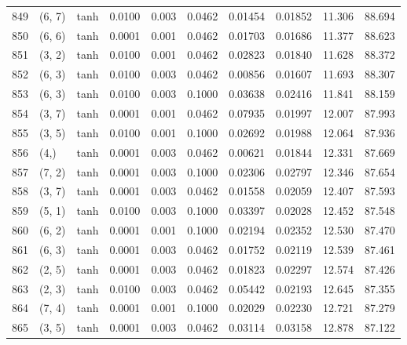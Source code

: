 \begin{tabular}{lllrrrrrrr}
849 &      (6, 7) &      tanh &  0.0100 &  0.003 &  0.0462 &          0.01454 &    0.01852 &      11.306 &    88.694 \\
850 &      (6, 6) &      tanh &  0.0001 &  0.001 &  0.0462 &          0.01703 &    0.01686 &      11.377 &    88.623 \\
851 &      (3, 2) &      tanh &  0.0100 &  0.001 &  0.0462 &          0.02823 &    0.01840 &      11.628 &    88.372 \\
852 &      (6, 3) &      tanh &  0.0100 &  0.003 &  0.0462 &          0.00856 &    0.01607 &      11.693 &    88.307 \\
853 &      (6, 3) &      tanh &  0.0100 &  0.003 &  0.1000 &          0.03638 &    0.02416 &      11.841 &    88.159 \\
854 &      (3, 7) &      tanh &  0.0001 &  0.001 &  0.0462 &          0.07935 &    0.01997 &      12.007 &    87.993 \\
855 &      (3, 5) &      tanh &  0.0100 &  0.001 &  0.1000 &          0.02692 &    0.01988 &      12.064 &    87.936 \\
856 &        (4,) &      tanh &  0.0001 &  0.003 &  0.0462 &          0.00621 &    0.01844 &      12.331 &    87.669 \\
857 &      (7, 2) &      tanh &  0.0001 &  0.003 &  0.1000 &          0.02306 &    0.02797 &      12.346 &    87.654 \\
858 &      (3, 7) &      tanh &  0.0001 &  0.003 &  0.0462 &          0.01558 &    0.02059 &      12.407 &    87.593 \\
859 &      (5, 1) &      tanh &  0.0100 &  0.003 &  0.1000 &          0.03397 &    0.02028 &      12.452 &    87.548 \\
860 &      (6, 2) &      tanh &  0.0001 &  0.001 &  0.1000 &          0.02194 &    0.02352 &      12.530 &    87.470 \\
861 &      (6, 3) &      tanh &  0.0001 &  0.003 &  0.0462 &          0.01752 &    0.02119 &      12.539 &    87.461 \\
862 &      (2, 5) &      tanh &  0.0001 &  0.003 &  0.0462 &          0.01823 &    0.02297 &      12.574 &    87.426 \\
863 &      (2, 3) &      tanh &  0.0100 &  0.003 &  0.0462 &          0.05442 &    0.02193 &      12.645 &    87.355 \\
864 &      (7, 4) &      tanh &  0.0001 &  0.001 &  0.1000 &          0.02029 &    0.02230 &      12.721 &    87.279 \\
865 &      (3, 5) &      tanh &  0.0001 &  0.003 &  0.0462 &          0.03114 &    0.03158 &      12.878 &    87.122 \\

\end{tabular}
